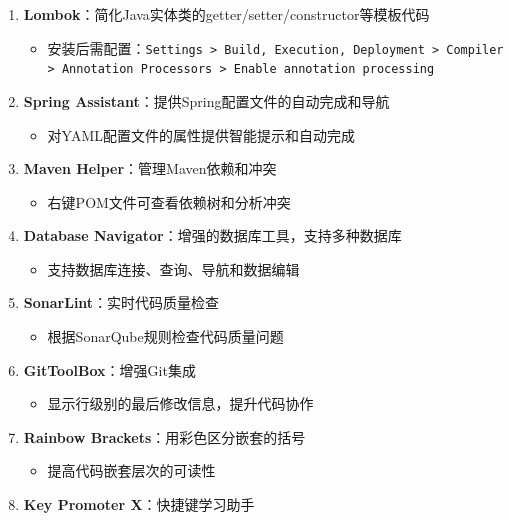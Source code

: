 \begin{enumerate}
\def\labelenumi{\arabic{enumi}.}
\tightlist
\item
  \textbf{Lombok}：简化Java实体类的getter/setter/constructor等模板代码

  \begin{itemize}
  \tightlist
  \item
    安装后需配置：\passthrough{\lstinline!Settings > Build, Execution, Deployment > Compiler > Annotation Processors > Enable annotation processing!}
  \end{itemize}
\item
  \textbf{Spring Assistant}：提供Spring配置文件的自动完成和导航

  \begin{itemize}
  \tightlist
  \item
    对YAML配置文件的属性提供智能提示和自动完成
  \end{itemize}
\item
  \textbf{Maven Helper}：管理Maven依赖和冲突

  \begin{itemize}
  \tightlist
  \item
    右键POM文件可查看依赖树和分析冲突
  \end{itemize}
\item
  \textbf{Database Navigator}：增强的数据库工具，支持多种数据库

  \begin{itemize}
  \tightlist
  \item
    支持数据库连接、查询、导航和数据编辑
  \end{itemize}
\item
  \textbf{SonarLint}：实时代码质量检查

  \begin{itemize}
  \tightlist
  \item
    根据SonarQube规则检查代码质量问题
  \end{itemize}
\item
  \textbf{GitToolBox}：增强Git集成

  \begin{itemize}
  \tightlist
  \item
    显示行级别的最后修改信息，提升代码协作
  \end{itemize}
\item
  \textbf{Rainbow Brackets}：用彩色区分嵌套的括号

  \begin{itemize}
  \tightlist
  \item
    提高代码嵌套层次的可读性
  \end{itemize}
\item
  \textbf{Key Promoter X}：快捷键学习助手


\end{enumerate}
